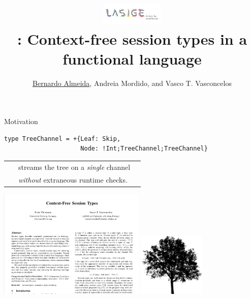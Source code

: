 \documentclass[10pt]{beamer}
\title[FreeST]{\hfill \includegraphics[width=3cm]{img/normal} \\\vspace*{4mm} 
				\freest: Context-free session types in a functional language}
\date{
\vspace*{1cm}
\begin{center}
	April 2019
\end{center}}
\author[A.Mordido, V.Vasconcelos]{\underline{Bernardo Almeida}, Andreia Mordido, and Vasco T. Vasconcelos}
\institute[LASIGE, Faculdade de Ci\^encias, ULisboa]{LASIGE, Faculdade de Ci\^encias, Universidade de Lisboa \\\\
}
\begin{document}
\lstset{language=Haskell}

\maketitle

\begin{frame}[fragile]{Motivation}
\vspace*{5mm}

\begin{lstlisting}
type TreeChannel = +{Leaf: Skip, 
                     Node: !Int;TreeChannel;TreeChannel}
\end{lstlisting}

\begin{tabular}{lll}
	\freest\ & streams the tree on a \emph{single} channel\\
	& \emph{without} extraneous runtime checks.
\end{tabular}

\includegraphics[width=7cm]{img/thiemann_vasconcelos.png}
\hfill \includegraphics[height=3cm]{img/tree}
\end{frame}

%
\newcommand{\leaf}{$\bullet$}
%
\end{document}
